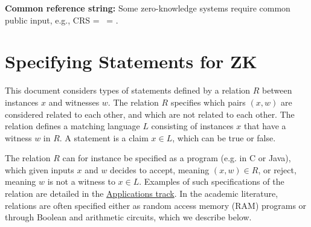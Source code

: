 {\bfseries Common reference string:} Some zero-knowledge systems require common public input, e.g., CRS = \setP\ = \setV.

\section{Specifying Statements for ZK}
\label{security:spec-statements-ZK}

 
	This document considers types of statements defined by a relation $R$ between instances $x$ and witnesses $w$.
	The relation $R$ specifies which pairs $(x,w)$ are considered related to each other, and which are not related to each other.
	The relation defines a matching language $L$ consisting of instances $x$ that have a witness $w$ in $R$.
	A statement is a claim $x \in L$, which can be true or false.
 
	The relation $R$ can for instance be specified as a program (e.g. in C or Java), which given inputs $x$ and $w$ decides to accept, meaning $(x,w) \in R$, or reject, meaning $w$ is not a witness to $x \in L$. 
	Examples of such specifications of the relation are detailed in the \hyperref[chap:track-apps]{Applications track}.
	In the academic literature, relations are often specified either as 
random access memory (RAM)
programs or through %
Boolean
and arithmetic circuits, which we describe below.


